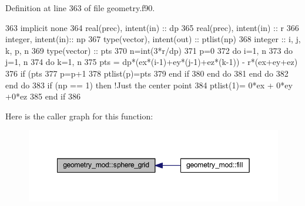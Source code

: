 Definition at line 363 of file geometry.\+f90.


\begin{DoxyCode}
363     \textcolor{keywordtype}{implicit none}
364     \textcolor{keywordtype}{real(prec)}, \textcolor{keywordtype}{intent(in)} :: dp
365     \textcolor{keywordtype}{real(prec)}, \textcolor{keywordtype}{intent(in)} :: r
366     \textcolor{keywordtype}{integer}, \textcolor{keywordtype}{intent(in)}::  np
367     \textcolor{keywordtype}{type}(vector), \textcolor{keywordtype}{intent(out)} :: ptlist(np)
368     \textcolor{keywordtype}{integer} :: i, j, k, p, n
369     \textcolor{keywordtype}{type}(vector) :: pts
370     n=int(3*r/dp)
371     p=0
372     \textcolor{keywordflow}{do} i=1, n
373         \textcolor{keywordflow}{do} j=1, n
374             \textcolor{keywordflow}{do} k=1, n
375                 pts = dp*(ex*(i-1)+ey*(j-1)+ez*(k-1)) - r*(ex+ey+ez)
376                 \textcolor{keywordflow}{if} (pts%
377                     p=p+1
378                     ptlist(p)=pts
379 \textcolor{keywordflow}{                end if}
380 \textcolor{keywordflow}{            end do}
381 \textcolor{keywordflow}{        end do}
382 \textcolor{keywordflow}{    end do}
383     \textcolor{keywordflow}{if} (np == 1) \textcolor{keywordflow}{then} \textcolor{comment}{!Just the center point}
384         ptlist(1)= 0*ex + 0*ey +0*ez
385 \textcolor{keywordflow}{    end if}
386 
\end{DoxyCode}
Here is the caller graph for this function\+:
\nopagebreak
\begin{figure}[H]
\begin{center}
\leavevmode
\includegraphics[width=349pt]{namespacegeometry__mod_a6c03a4ea3de6763940396dbeb3908ebc_icgraph}
\end{center}
\end{figure}
\mbox{\label{namespacegeometry__mod_a05de7940b4e7df5a2b31f3d0414e3743}} 
